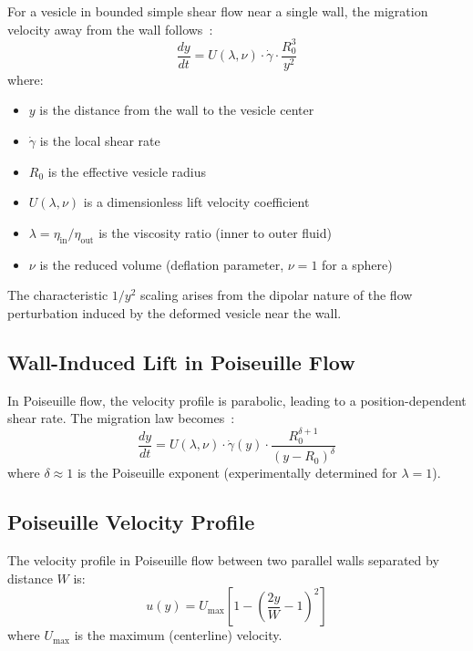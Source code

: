 \documentclass{article}
\begin{document}
For a vesicle in bounded simple shear flow near a single wall, the migration velocity away from the wall follows~\cite{coupier2009}:
\begin{equation}
    \frac{dy}{dt} = U(\lambda, \nu) \cdot \dot{\gamma} \cdot \frac{R_0^3}{y^2}
    \label{eq:simple_shear}
\end{equation}
where:
\begin{itemize}
    \item $y$ is the distance from the wall to the vesicle center
    \item $\dot{\gamma}$ is the local shear rate
    \item $R_0$ is the effective vesicle radius
    \item $U(\lambda, \nu)$ is a dimensionless lift velocity coefficient
    \item $\lambda = \eta_{\text{in}}/\eta_{\text{out}}$ is the viscosity ratio (inner to outer fluid)
    \item $\nu$ is the reduced volume (deflation parameter, $\nu = 1$ for a sphere)
\end{itemize}

The characteristic $1/y^2$ scaling arises from the dipolar nature of the flow perturbation induced by the deformed vesicle near the wall.

\subsection{Wall-Induced Lift in Poiseuille Flow}

In Poiseuille flow, the velocity profile is parabolic, leading to a position-dependent shear rate. The migration law becomes~\cite{coupier2009}:
\begin{equation}
    \frac{dy}{dt} = U(\lambda, \nu) \cdot \dot{\gamma}(y) \cdot \frac{R_0^{\delta+1}}{(y - R_0)^\delta}
    \label{eq:poiseuille}
\end{equation}
where $\delta \approx 1$ is the Poiseuille exponent (experimentally determined for $\lambda = 1$).

\subsection{Poiseuille Velocity Profile}

The velocity profile in Poiseuille flow between two parallel walls separated by distance $W$ is:
\begin{equation}
    u(y) = U_{\max} \left[ 1 - \left(\frac{2y}{W} - 1\right)^2 \right]
    \label{eq:velocity_profile}
\end{equation}
where $U_{\max}$ is the maximum (centerline) velocity.
\end{document}
